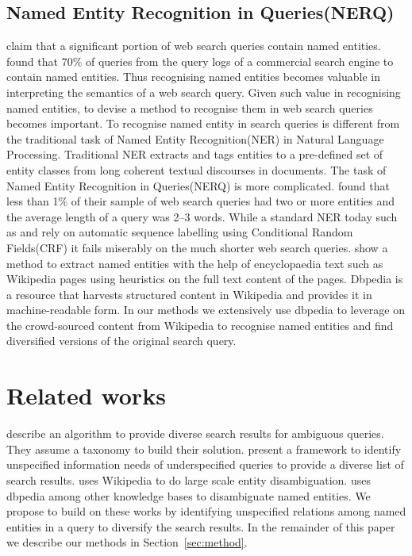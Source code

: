 \documentclass[11pt]{article}
\begin{document}
\subsection{Named Entity Recognition in Queries(NERQ)}
\cite{guo2009named} \cite{DBLP:conf/cikm/Pasca07a} claim that a 
significant portion of web search queries contain named entities.
\cite{guo2009named} found that 70\% of queries from the query logs of a 
commercial search engine to contain named entities. Thus recognising named 
entities becomes valuable in interpreting the semantics of a web search 
query. Given such value in recognising named entities, to devise a method 
to recognise them in web search queries becomes important. To recognise
named entity in search queries is different from the traditional 
task of Named Entity Recognition(NER) in Natural Language Processing. 
Traditional NER extracts and tags entities to a pre-defined set of entity 
classes from long coherent textual discourses in documents. The task of 
Named Entity Recognition in Queries(NERQ) is more complicated. \cite{guo2009named} 
found that less than 1\% of their sample of web search queries had two or more 
entities and the average length of a query was 2--3 words. While a standard NER 
today such as \cite{finkel2005incorporating} and \cite{ratinov2009design} rely 
on automatic sequence labelling using Conditional Random Fields(CRF) it fails 
miserably on the much shorter web search queries. \cite{bunescu2006using} show 
a method to extract named entities with the help of encyclopaedia text such as 
Wikipedia pages using heuristics on the full text content of the pages. 
Dbpedia \cite{auer2007dbpedia} is a resource that harvests structured 
content in Wikipedia and provides it in machine-readable form. In our methods we 
extensively use dbpedia to leverage on the crowd-sourced content 
from Wikipedia to recognise named entities and find diversified versions of the 
original search query.

\section{Related works}

\cite{agrawal2009diversifying} describe an algorithm to provide diverse search 
results for ambiguous queries. They assume a taxonomy to build their solution.
\cite{santos2010exploiting} present a framework to identify unspecified information 
needs of underspecified queries to provide a diverse list of search results. 
\cite{cucerzan2007large} uses Wikipedia \cite{wiki:Online} to do large scale entity 
disambiguation. \cite{hoffart2011robust} uses dbpedia among other knowledge bases to 
disambiguate named entities. We propose to build on these works by identifying 
unspecified relations among named entities in a query to diversify the search results. 
In the remainder of this paper we describe our methods in Section~\ref{sec:method}.
\end{document}
